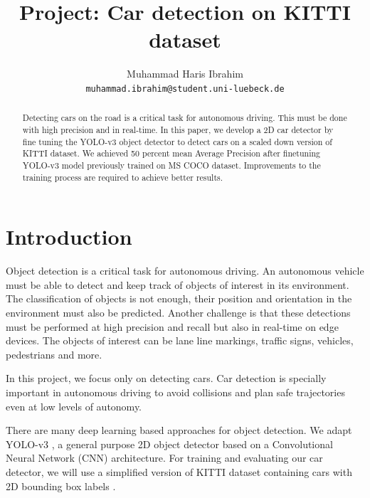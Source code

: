 \documentclass[10pt,twocolumn,letterpaper]{article}
\begin{document}
\title{Project: Car detection on KITTI dataset}

\author{Muhammad Haris Ibrahim\\
{\tt\small muhammad.ibrahim@student.uni-luebeck.de}
}

\maketitle

\begin{abstract}
  Detecting cars on the road is a critical task for autonomous driving. This must be done with high precision and in real-time. 
  In this paper, we develop a 2D car detector by fine tuning the YOLO-v3 object detector to detect cars on a scaled down version of KITTI dataset. 
  We achieved 50 percent mean Average Precision after finetuning YOLO-v3 model previously trained on MS COCO dataset. 
  Improvements to the training process are required to achieve better results.
\end{abstract}

\section{Introduction}
Object detection is a critical task for autonomous driving. An autonomous vehicle must be able to detect and keep track of objects of interest in its environment. The classification of objects is not enough, their position and orientation in the environment must also be predicted. 
Another challenge is that these detections must be performed at high precision and recall but also in real-time on edge devices. The objects of interest can be lane line markings, traffic signs, vehicles, pedestrians and more. 

In this project, we focus only on detecting cars. Car detection is specially important in autonomous driving to avoid collisions and plan safe trajectories even at low levels of autonomy.

There are many deep learning based approaches for object detection. We adapt YOLO-v3 \cite{redmon2018yolov3}, a general purpose 2D object detector based on a Convolutional Neural Network (CNN) architecture. For training and evaluating our car detector, we will use a simplified version of KITTI dataset containing cars with 2D bounding box labels \cite{KITTI}.
\end{document}
